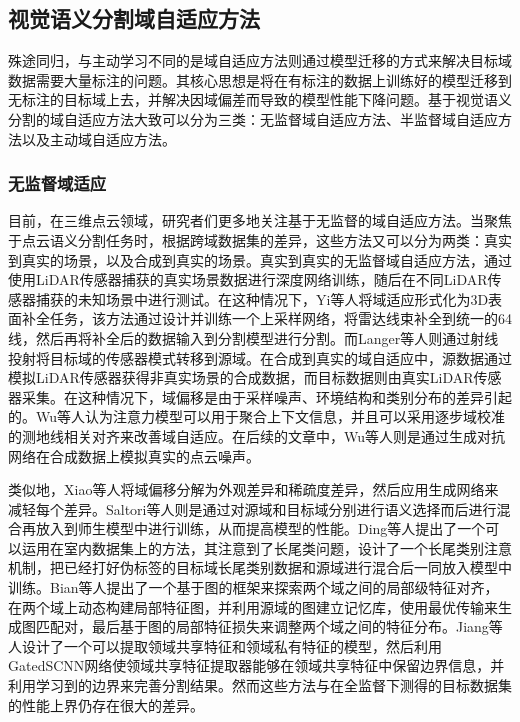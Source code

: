 \subsection{视觉语义分割域自适应方法}
殊途同归，与主动学习不同的是域自适应方法则通过模型迁移的方式来解决目标域数据需要大量标注的问题。其核心思想是将在有标注的数据上训练好的模型迁移到无标注的目标域上去，并解决因域偏差而导致的模型性能下降问题。基于视觉语义分割的域自适应方法大致可以分为三类：无监督域自适应方法、半监督域自适应方法以及主动域自适应方法。
\subsubsection{无监督域适应}
目前，在三维点云领域，研究者们更多地关注基于无监督的域自适应方法。当聚焦于点云语义分割任务时，根据跨域数据集的差异，这些方法又可以分为两类：真实到真实的场景，以及合成到真实的场景。真实到真实的无监督域自适应方法，通过使用LiDAR传感器捕获的真实场景数据进行深度网络训练，随后在不同LiDAR传感器捕获的未知场景中进行测试。在这种情况下，Yi等人将域适应形式化为3D表面补全任务，该方法通过设计并训练一个上采样网络，将雷达线束补全到统一的64线，然后再将补全后的数据输入到分割模型进行分割。而Langer等人则通过射线投射将目标域的传感器模式转移到源域。在合成到真实的域自适应中，源数据通过模拟LiDAR传感器获得非真实场景的合成数据，而目标数据则由真实LiDAR传感器采集。在这种情况下，域偏移是由于采样噪声、环境结构和类别分布的差异引起的。Wu等人认为注意力模型可以用于聚合上下文信息，并且可以采用逐步域校准的测地线相关对齐来改善域自适应。在后续的文章中，Wu等人则是通过生成对抗网络在合成数据上模拟真实的点云噪声。

类似地，Xiao等人将域偏移分解为外观差异和稀疏度差异，然后应用生成网络来减轻每个差异。Saltori等人则是通过对源域和目标域分别进行语义选择而后进行混合再放入到师生模型中进行训练，从而提高模型的性能。Ding等人提出了一个可以运用在室内数据集上的方法，其注意到了长尾类问题，设计了一个长尾类别注意机制，把已经打好伪标签的目标域长尾类别数据和源域进行混合后一同放入模型中训练。Bian等人提出了一个基于图的框架来探索两个域之间的局部级特征对齐，在两个域上动态构建局部特征图，并利用源域的图建立记忆库，使用最优传输来生成图匹配对，最后基于图的局部特征损失来调整两个域之间的特征分布。Jiang等人设计了一个可以提取领域共享特征和领域私有特征的模型，然后利用GatedSCNN网络使领域共享特征提取器能够在领域共享特征中保留边界信息，并利用学习到的边界来完善分割结果。然而这些方法与在全监督下测得的目标数据集的性能上界仍存在很大的差异。
